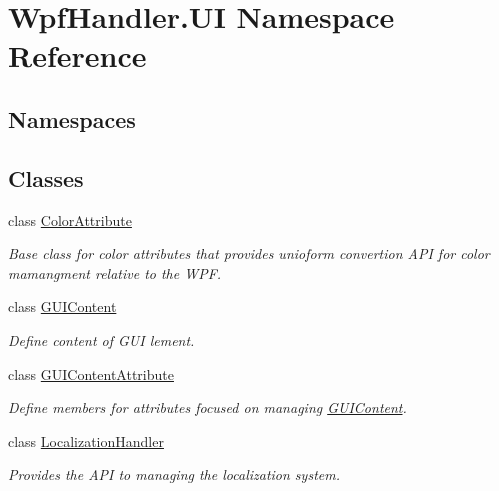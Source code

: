 \hypertarget{namespace_wpf_handler_1_1_u_i}{}\section{Wpf\+Handler.\+UI Namespace Reference}
\label{namespace_wpf_handler_1_1_u_i}
\subsection*{Namespaces}
\begin{DoxyCompactItemize}
\end{DoxyCompactItemize}
\subsection*{Classes}
\begin{DoxyCompactItemize}
\item 
class \mbox{\hyperlink{class_wpf_handler_1_1_u_i_1_1_color_attribute}{Color\+Attribute}}
\begin{DoxyCompactList}\small\item\em Base class for color attributes that provides unioform convertion A\+PI for color mamangment relative to the W\+PF. \end{DoxyCompactList}\item 
class \mbox{\hyperlink{class_wpf_handler_1_1_u_i_1_1_g_u_i_content}{G\+U\+I\+Content}}
\begin{DoxyCompactList}\small\item\em Define content of G\+UI lement. \end{DoxyCompactList}\item 
class \mbox{\hyperlink{class_wpf_handler_1_1_u_i_1_1_g_u_i_content_attribute}{G\+U\+I\+Content\+Attribute}}
\begin{DoxyCompactList}\small\item\em Define members for attributes focused on managing \mbox{\hyperlink{class_wpf_handler_1_1_u_i_1_1_g_u_i_content}{G\+U\+I\+Content}}. \end{DoxyCompactList}\item 
class \mbox{\hyperlink{class_wpf_handler_1_1_u_i_1_1_localization_handler}{Localization\+Handler}}
\begin{DoxyCompactList}\small\item\em Provides the A\+PI to managing the localization system. \end{DoxyCompactList}\end{DoxyCompactItemize}
